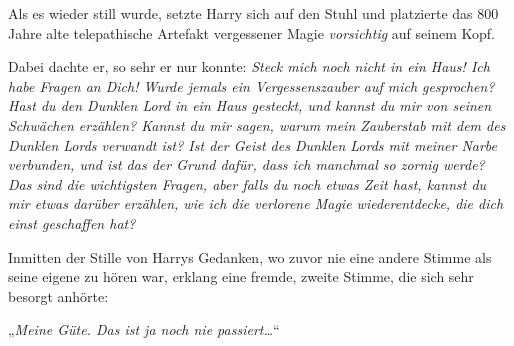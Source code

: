 Als es wieder still wurde, setzte Harry sich auf den Stuhl und platzierte das 800 Jahre alte telepathische Artefakt vergessener Magie \emph{vorsichtig} auf seinem Kopf.

Dabei dachte er, so sehr er nur konnte: \emph{Steck mich noch nicht in ein Haus! Ich habe Fragen an Dich! Wurde jemals ein Vergessenszauber auf mich gesprochen? Hast du den Dunklen Lord in ein Haus gesteckt, und kannst du mir von seinen Schwächen erzählen? Kannst du mir sagen, warum mein Zauberstab mit dem des Dunklen Lords verwandt ist? Ist der Geist des Dunklen Lords mit meiner Narbe verbunden, und ist das der Grund dafür, dass ich manchmal so zornig werde? Das sind die wichtigsten Fragen, aber falls du noch etwas Zeit hast, kannst du mir etwas darüber erzählen, wie ich die verlorene Magie wiederentdecke, die dich einst geschaffen hat?}

Inmitten der Stille von Harrys Gedanken, wo zuvor nie eine andere Stimme als seine eigene zu hören war, erklang eine fremde, zweite Stimme, die sich sehr besorgt anhörte:

„\emph{Meine Güte. Das ist ja noch nie passiert…}“

